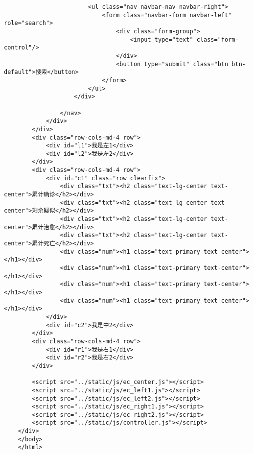\begin{lstlisting}
                        <ul class="nav navbar-nav navbar-right">
                            <form class="navbar-form navbar-left" role="search">
                                <div class="form-group">
                                    <input type="text" class="form-control"/>
                                </div>
                                <button type="submit" class="btn btn-default">搜索</button>
                            </form>
                        </ul>
                    </div>
    
                </nav>
            </div>
        </div>
        <div class="row-cols-md-4 row">
            <div id="l1">我是左1</div>
            <div id="l2">我是左2</div>
        </div>
        <div class="row-cols-md-4 row">
            <div id="c1" class="row clearfix">
                <div class="txt"><h2 class="text-lg-center text-center">累计确诊</h2></div>
                <div class="txt"><h2 class="text-lg-center text-center">剩余疑似</h2></div>
                <div class="txt"><h2 class="text-lg-center text-center">累计治愈</h2></div>
                <div class="txt"><h2 class="text-lg-center text-center">累计死亡</h2></div>
                <div class="num"><h1 class="text-primary text-center"></h1></div>
                <div class="num"><h1 class="text-primary text-center"></h1></div>
                <div class="num"><h1 class="text-primary text-center"></h1></div>
                <div class="num"><h1 class="text-primary text-center"></h1></div>
            </div>
            <div id="c2">我是中2</div>
        </div>
        <div class="row-cols-md-4 row">
            <div id="r1">我是右1</div>
            <div id="r2">我是右2</div>
        </div>
    
        <script src="../static/js/ec_center.js"></script>
        <script src="../static/js/ec_left1.js"></script>
        <script src="../static/js/ec_left2.js"></script>
        <script src="../static/js/ec_right1.js"></script>
        <script src="../static/js/ec_right2.js"></script>
        <script src="../static/js/controller.js"></script>
    </div>
    </body>
    </html>
\end{lstlisting}

